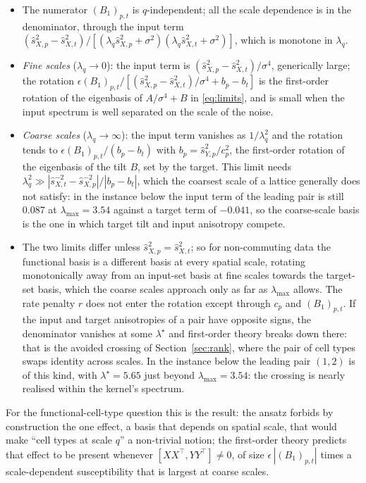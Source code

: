 \documentclass[11pt,a4paper]{article}
\begin{document}
\begin{itemize}
  \item The numerator $(B_1)_{p,t}$ is $q$-independent; all the scale dependence is in the denominator, through the input term $(\hat s_{X,p}^2 - \hat s_{X,t}^2)/[(\lambda_q\hat s_{X,p}^2+\sigma^2)(\lambda_q\hat s_{X,t}^2+\sigma^2)]$, which is monotone in $\lambda_q$.
  \item \emph{Fine scales} ($\lambda_q \to 0$): the input term is $(\hat s_{X,p}^2 - \hat s_{X,t}^2)/\sigma^4$, generically large; the rotation $\epsilon(B_1)_{p,t}\big/[(\hat s_{X,p}^2 - \hat s_{X,t}^2)/\sigma^4 + b_p - b_t]$ is the first-order rotation of the eigenbasis of $A/\sigma^4 + B$ in \eqref{eq:limits}, and is small when the input spectrum is well separated on the scale of the noise.
  \item \emph{Coarse scales} ($\lambda_q \to \infty$): the input term vanishes as $1/\lambda_q^2$ and the rotation tends to $\epsilon(B_1)_{p,t}/(b_p - b_t)$ with $b_p = \hat s_{Y,p}^2/c_p^2$, the first-order rotation of the eigenbasis of the tilt $B$, set by the target. This limit needs $\lambda_q^2 \gg |\hat s_{X,t}^{-2} - \hat s_{X,p}^{-2}|/|b_p - b_t|$, which the coarsest scale of a lattice generally does not satisfy: in the instance below the input term of the leading pair is still $0.087$ at $\lambda_{\max} = 3.54$ against a target term of $-0.041$, so the coarse-scale basis is the one in which target tilt and input anisotropy compete.
  \item The two limits differ unless $\hat s_{X,p}^2 = \hat s_{X,t}^2$; so for non-commuting data the functional basis is a different basis at every spatial scale, rotating monotonically away from an input-set basis at fine scales towards the target-set basis, which the coarse scales approach only as far as $\lambda_{\max}$ allows. The rate penalty $r$ does not enter the rotation except through $c_p$ and $(B_1)_{p,t}$. If the input and target anisotropies of a pair have opposite signs, the denominator vanishes at some $\lambda^\star$ and first-order theory breaks down there: that is the avoided crossing of Section~\ref{sec:rank}, where the pair of cell types swaps identity across scales. In the instance below the leading pair $(1,2)$ is of this kind, with $\lambda^\star = 5.65$ just beyond $\lambda_{\max} = 3.54$: the crossing is nearly realised within the kernel's spectrum.
\end{itemize}
For the functional-cell-type question this is the result: the ansatz forbids by construction the one effect, a basis that depends on spatial scale, that would make ``cell types at scale $q$'' a non-trivial notion; the first-order theory predicts that effect to be present whenever $[XX^\top,YY^\top]\ne0$, of size $\epsilon\,|(B_1)_{p,t}|$ times a scale-dependent susceptibility that is largest at coarse scales.
\end{document}
